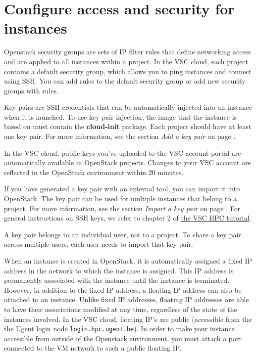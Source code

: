 \chapter{Configure access and security for instances}
Openstack security groups are sets of IP filter rules that define
networking access and are applied to all instances within a project.
In the VSC cloud, each project contains a default security group,
which allows you to ping instances and connect using SSH.  You can add
rules to the default security group or add new security groups with
rules.

Key pairs are SSH credentials that can be automatically injected into
an instance when it is launched. To use key pair injection, the image
that the instance is based on must contain the \textbf{cloud-init}
package. Each project should have at least one key pair. For more
information, see the section \emph{Add a key pair} on page
\pageref{add-a-key-pair}.

 In the VSC cloud, public keys you've uploaded to the
VSC account portal are automatically available in OpenStack projects.
Changes to your VSC account are reflected in the OpenStack environment
within 20 minutes.

If you have generated a key pair with an external tool, you can import
it into \gls{OpenStack}. The key pair can be used for multiple
instances that belong to a project. For more information, see the
section {\emph{Import a key pair}} on page
\pageref{import-a-key-pair}.  For general instructions on SSH keys, we
refer to chapter 2 of
\href{https://www.vscentrum.be/support/tut-book/vsc-tutorials}{the VSC
  HPC tutorial}.

 A key pair belongs to an individual user, not to a
project. To share a key pair across multiple users, each user needs to
import that key pair.

When an instance is created in \gls{OpenStack}, it is automatically
assigned a fixed IP address in the network to which the instance is
assigned. This IP address is permanently associated with the instance
until the instance is terminated. However, in addition to the fixed IP
address, a floating IP address can also be attached to an
instance. Unlike fixed IP addresses, floating IP addresses are able to
have their associations modified at any time, regardless of the state
of the instances involved.  In the VSC cloud, floating IP's are public
(accessible from the the Ugent login node
\lstinline{login.hpc.ugent.be}).  In order to make your instance
accessible from outside of the Openstack environment, you must attach
a port connected to the VM network to such a public floating IP.

